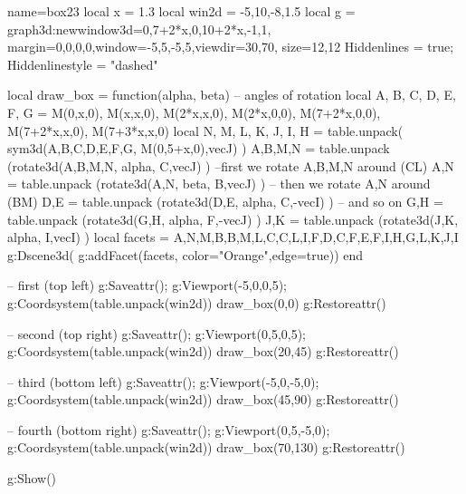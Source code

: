 \documentclass[12pt]{standalone}
\begin{document}
\begin{luadraw}{name=box23}
local x = 1.3
local win2d = {-5,10,-8,1.5}
local g = graph3d:new{window3d={0,7+2*x,0,10+2*x,-1,1}, margin={0,0,0,0},window={-5,5,-5,5},viewdir={30,70}, size={12,12}}
Hiddenlines = true; Hiddenlinestyle = "dashed" 

local draw_box = function(alpha, beta) -- angles of rotation
    local A, B, C, D, E, F, G = M(0,x,0), M(x,x,0), M(2*x,x,0), M(2*x,0,0), M(7+2*x,0,0), M(7+2*x,x,0), M(7+3*x,x,0)
    local N, M, L, K, J, I, H = table.unpack( sym3d({A,B,C,D,E,F,G}, {M(0,5+x,0),vecJ}) )
    A,B,M,N = table.unpack (rotate3d({A,B,M,N}, alpha, {C,vecJ}) ) --first we rotate A,B,M,N around (CL)
    A,N = table.unpack (rotate3d({A,N}, beta, {B,vecJ}) ) -- then we rotate A,N around (BM)
    D,E = table.unpack (rotate3d({D,E}, alpha, {C,-vecI}) ) -- and so on
    G,H = table.unpack (rotate3d({G,H}, alpha, {F,-vecJ}) )
    J,K = table.unpack (rotate3d({J,K}, alpha, {I,vecI}) )
    local facets = {{A,N,M,B},{B,M,L,C},{C,L,I,F},{D,C,F,E},{F,I,H,G},{L,K,J,I} }
    g:Dscene3d(
        g:addFacet(facets, {color="Orange",edge=true}))
end

-- first (top left)
g:Saveattr(); g:Viewport(-5,0,0,5); g:Coordsystem(table.unpack(win2d))
draw_box(0,0)
g:Restoreattr()

-- second (top right)
g:Saveattr(); g:Viewport(0,5,0,5); g:Coordsystem(table.unpack(win2d))
draw_box(20,45)
g:Restoreattr()

-- third (bottom left)
g:Saveattr(); g:Viewport(-5,0,-5,0); g:Coordsystem(table.unpack(win2d))
draw_box(45,90)
g:Restoreattr()

-- fourth (bottom right)
g:Saveattr(); g:Viewport(0,5,-5,0); g:Coordsystem(table.unpack(win2d))
draw_box(70,130)
g:Restoreattr()

g:Show() 
\end{luadraw}
\end{document}
